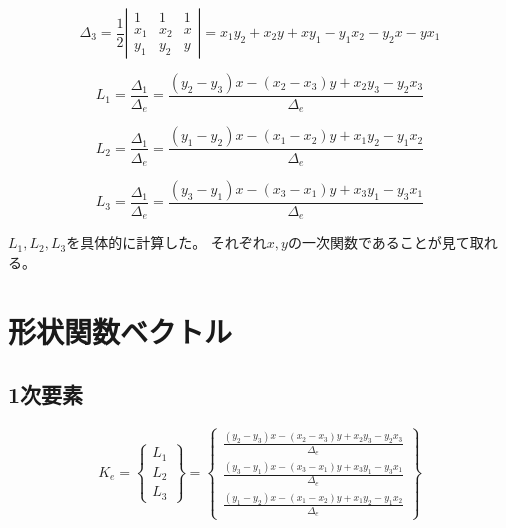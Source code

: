 \documentclass{jarticle}
\begin{document}
\begin{equation}
  \Delta_3 = \frac{1}{2}\left|\begin{array}{ccc}
  1&1&1\\
  x_1&x_2&x\\
  y_1&y_2&y
  \end{array}\right|=x_1 y_2 + x_2 y + x y_1- y_1 x_2 - y_2 x - y x_1
\end{equation}

\begin{equation}
  L_1 = \frac{\Delta_1}{\Delta_e} = \frac{(y_2-y_3)x-(x_2-x_3)y +x_2 y_3 - y_2 x_3}{\Delta_e}
\end{equation}


\begin{equation}
  L_2 = \frac{\Delta_1}{\Delta_e} = \frac{(y_1-y_2)x-(x_1-x_2)y +x_1 y_2 - y_1 x_2}{\Delta_e}
\end{equation}


\begin{equation}
  L_3 = \frac{\Delta_1}{\Delta_e} = \frac{(y_3-y_1)x-(x_3-x_1)y +x_3 y_1 - y_3 x_1}{\Delta_e}
\end{equation}

$L_1, L_2, L_3$を具体的に計算した。
それぞれ$x,y$の一次関数であることが見て取れる。

\section{形状関数ベクトル}



\subsection{1次要素}
\begin{equation}
  K_e = \left\{\begin{array}{c}
      L_1\\
      L_2\\
      L_3
  \end{array}\right\} = \left\{\begin{array}{c}
  \frac{(y_2-y_3)x-(x_2-x_3)y +x_2 y_3 - y_2 x_3}{\Delta_e}\\
  \frac{(y_3-y_1)x-(x_3-x_1)y +x_3 y_1 - y_3 x_1}{\Delta_e}\\
  \frac{(y_1-y_2)x-(x_1-x_2)y +x_1 y_2 - y_1 x_2}{\Delta_e}
  \end{array}\right\}
\end{equation}
\end{document}
